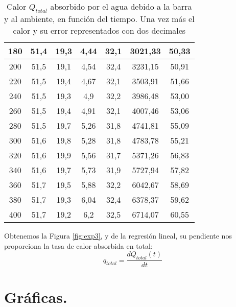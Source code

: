 \documentclass[a4paper,12pt,spanish]{article}
\begin{document}
\begin{table}[H]
\begin{tabular}{|c|c|c|c|c|c|c|}
		180         & 51,4   & 19,3  & 4,44      & 32,1       & 3021,33 & 50,33       \\ \hline
		200         & 51,5   & 19,1  & 4,54      & 32,4       & 3231,15 & 50,91       \\ \hline
		220         & 51,5   & 19,4  & 4,67      & 32,1       & 3503,91 & 51,66       \\ \hline
		240         & 51,5   & 19,3  & 4,9       & 32,2       & 3986,48 & 53,00       \\ \hline
		260         & 51,5   & 19,4  & 4,91      & 32,1       & 4007,46 & 53,06       \\ \hline
		280         & 51,5   & 19,7  & 5,26      & 31,8       & 4741,81 & 55,09       \\ \hline
		300         & 51,6   & 19,8  & 5,28      & 31,8       & 4783,78 & 55,21       \\ \hline
		320         & 51,6   & 19,9  & 5,56      & 31,7       & 5371,26 & 56,83       \\ \hline
		340         & 51,6   & 19,7  & 5,73      & 31,9       & 5727,94 & 57,82       \\ \hline
		360         & 51,7   & 19,5  & 5,88      & 32,2       & 6042,67 & 58,69       \\ \hline
		380         & 51,7   & 19,3  & 6,04      & 32,4       & 6378,37 & 59,62       \\ \hline
		400         & 51,7   & 19,2  & 6,2       & 32,5       & 6714,07 & 60,55       \\ \hline
	\end{tabular}
	\caption{Calor $Q_{total}$ absorbido por el agua debido a la barra y al ambiente, en función del tiempo. Una vez más el calor y su error representados con dos decimales}
	\label{tab:my-table}
\end{table}
	
	Obtenemos la Figura \ref{fig:exp3}, y de la regresión lineal, su pendiente nos proporciona la tasa de calor absorbida en total:
	\[ q_{total} = \frac{dQ_{total}(t)}{dt}
	\]
	
	
	
	\section{Gráficas.}
	
\end{document}
